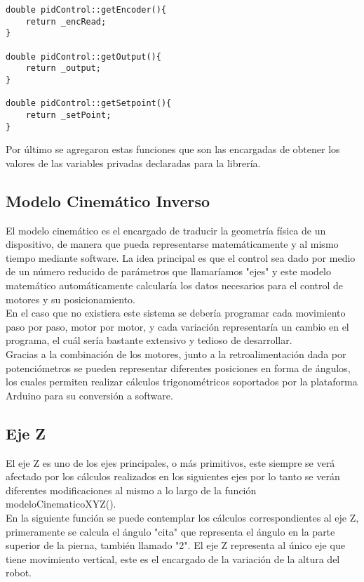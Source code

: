 \documentclass[12pt,letterpaper]{IEEEtran}
\begin{document}
\begin{lstlisting}
double pidControl::getEncoder(){
	return _encRead;
}

double pidControl::getOutput(){
	return _output;
}

double pidControl::getSetpoint(){
	return _setPoint;
}
\end{lstlisting}

Por último se agregaron estas funciones que son las encargadas de obtener los valores de las variables privadas declaradas para la librería.\\

\subsection{Modelo Cinemático Inverso}

El modelo cinemático es el encargado de traducir la geometría física de un dispositivo, de manera que pueda representarse matemáticamente y al mismo tiempo mediante software. La idea principal es que el control sea dado por medio de un número reducido de parámetros que llamaríamos "ejes" y este modelo matemático automáticamente calcularía los datos necesarios para el control de motores y su posicionamiento.\\
En el caso que no existiera este sistema se debería programar cada movimiento paso por paso, motor por motor, y cada variación representaría un cambio en el programa, el cuál sería bastante extensivo y tedioso de desarrollar.\\
Gracias a la combinación de los motores, junto a la retroalimentación dada por potenciómetros se pueden representar diferentes posiciones en forma de ángulos, los cuales permiten realizar cálculos trigonométricos soportados por la plataforma Arduino para su conversión a software.\\

\subsection*{Eje Z}
El eje Z es uno de los ejes principales, o más primitivos, este siempre se verá afectado por los cálculos realizados en los siguientes ejes por lo tanto se verán diferentes modificaciones al mismo a lo largo de la función modeloCinematicoXYZ().\\

En la siguiente función se puede contemplar los cálculos correspondientes al eje Z, primeramente se calcula el ángulo "cita" que representa el ángulo en la parte superior de la pierna, también llamado "2". El eje Z representa al único eje que tiene movimiento vertical, este es el encargado de la variación de la altura del robot.\\
\end{document}
